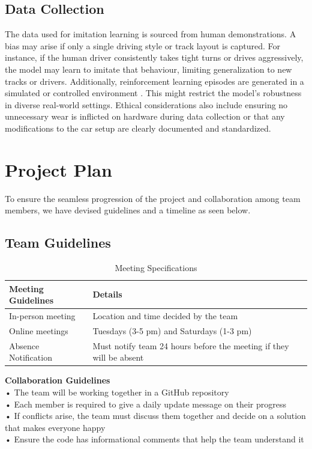 \documentclass{article} %
\begin{document}
\subsection{Data Collection}
The data used for imitation learning is sourced from human demonstrations. A bias may arise if only a single driving style or track layout is captured.
For instance, if the human driver consistently takes tight turns or drives aggressively, the model may learn to imitate that behaviour, limiting 
generalization to new tracks or drivers. Additionally, reinforcement learning episodes are generated in a simulated or controlled environment 
\citep{laskey2017comparinghumancentricrobotcentricsampling}. 
This might restrict the model's robustness in diverse real-world settings. Ethical considerations also include ensuring no unnecessary wear is inflicted 
on hardware during data collection or that any modifications to the car setup are clearly documented and standardized.

\section{Project Plan}
To ensure the seamless progression of the project and collaboration among team members, we have devised guidelines and a timeline as seen below.

\subsection{Team Guidelines}

\begin{table}[H]
\caption{Meeting Specifications}
\begin{center}
\begin{tabular}{|l|l|}
\hline
\textbf{Meeting Guidelines} & \textbf{Details} \\ \hline
In-person meeting           & Location and time decided by the team \\ \hline
Online meetings             & Tuesdays (3-5 pm) and Saturdays (1-3 pm) \\ \hline
Absence Notification        & Must notify team 24 hours before the meeting if they will be absent \\ \hline
\end{tabular}
\end{center}
\end{table}

\textbf{Collaboration Guidelines}
\\• The team will be working together in a GitHub repository
\\• Each member is required to give a daily update message on their progress
\\• If conflicts arise, the team must discuss them together and decide on a solution that makes everyone happy
\\• Ensure the code has informational comments that help the team understand it
\end{document}
